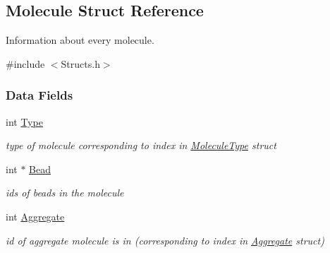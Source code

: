 \hypertarget{structMolecule}{}\subsection{Molecule Struct Reference}
\label{structMolecule}


Information about every molecule.  




{\ttfamily \#include $<$Structs.\+h$>$}

\subsubsection*{Data Fields}
\begin{DoxyCompactItemize}
\item 
\mbox{\label{structMolecule_a58e2c24f47913c49fe8f4eccba4d8e67}} 
int \hyperlink{structMolecule_a58e2c24f47913c49fe8f4eccba4d8e67}{Type}
\begin{DoxyCompactList}\small\item\em type of molecule corresponding to index in \hyperlink{structMoleculeType}{Molecule\+Type} struct \end{DoxyCompactList}\item 
\mbox{\label{structMolecule_a5a836def568c4add921cbfc8e20d1922}} 
int $\ast$ \hyperlink{structMolecule_a5a836def568c4add921cbfc8e20d1922}{Bead}
\begin{DoxyCompactList}\small\item\em ids of beads in the molecule \end{DoxyCompactList}\item 
\mbox{\label{structMolecule_a00446e38e2394e677f53524130c50fb1}} 
int \hyperlink{structMolecule_a00446e38e2394e677f53524130c50fb1}{Aggregate}
\begin{DoxyCompactList}\small\item\em id of aggregate molecule is in (corresponding to index in \hyperlink{structAggregate}{Aggregate} struct) \end{DoxyCompactList}\end{DoxyCompactItemize}
